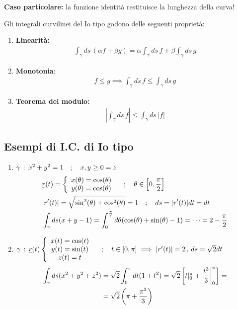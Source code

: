 \textbf{Caso particolare:} la funzione identità restituisce la lunghezza della curva!

\newpage

Gli integrali curvilinei del Io tipo godono delle seguenti proprietà:

\begin{enumerate}
	\item \textbf{Linearità:
	\begin{align}
	\int_{\gamma} ds \, (\alpha f + \beta g)= \alpha\int_{\gamma} ds \, f + \beta \int_{\gamma} ds \, g
	\end{align}}

	\item \textbf{Monotonia}:
	\begin{align}
	f\leq g \implies \int_{\gamma} ds \, f \leq \int_{\gamma} ds \, g
	\end{align}
	
	\item \textbf{Teorema del modulo:}
	\begin{align}
	\left| \int_{\gamma} ds \, f \right| \leq \int_{\gamma} ds \, |f|
	\end{align}
\end{enumerate}


\subsection{Esempi di I.C. di Io tipo}

\begin{enumerate}
	\item $\gamma \, : \, x^2 +y^2 =1 \quad ; \quad x,y \geq 0 = z$ 
	\begin{align}
	{}&\underline{r}(t)= \left\{\begin{array}{cc} x(\theta)= \cos(\theta) \\ y(\theta) = \cos(\theta) \end{array}\right.\quad ; \quad \theta \in \left[0,\frac{\pi}{2}\right] \\
	&|r'(t)|= \sqrt{\sin^2(\theta) + \cos^2(\theta)}=1 \quad ; \quad ds = |r'(t)|dt=dt\\
	&\int_{\gamma} ds (x + y -1) = \int_{0}^{\frac{\pi}{2}}d\theta ( \cos(\theta) + \sin(\theta) -1)= \dots = 2 - \frac{\pi}{2}
	\end{align}

	\item $\gamma \, : \, \underline{r}(t) \left\{\begin{array}{cc} x(t)= \cos(t) \\ y(t)= \sin(t) \\ z(t)=t \end{array}\right. \quad ; \quad t \in [0,\pi] \implies |r'(t)|= 2 \, , \, ds = \sqrt{2}dt$
	\begin{align}
	\int_{\gamma} ds (x^2 + y^2 + z^2) {}&= \sqrt{2}\int_{0}^{\pi} dt (1 + t^2) = \sqrt{2} \left[t|_0^\pi + \left.\frac{t^3}{3}\right|_0^\pi \right] = \nonumber \\ &=\sqrt{2}\left(\pi + \frac{\pi^3}{3}\right)
	\end{align}
	
\end{enumerate}

